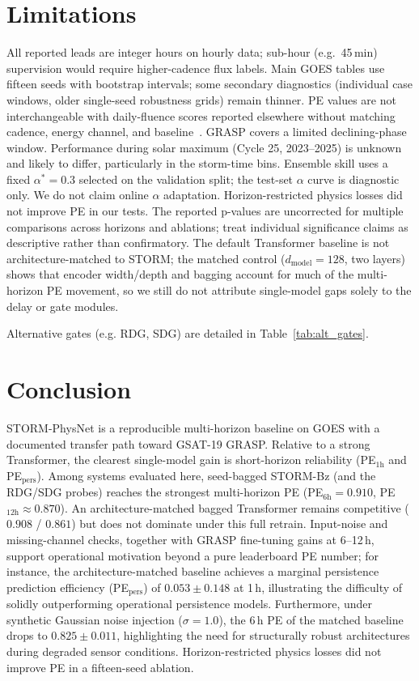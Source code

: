 \documentclass{ieeeaccess}
\begin{document}
\section{Limitations}
\label{sec:limits}
All reported leads are integer hours on hourly data; sub-hour (e.g.\ 45\,min) supervision would require higher-cadence flux labels.
Main GOES tables use fifteen seeds with bootstrap intervals; some
secondary diagnostics (individual case windows, older single-seed
robustness grids) remain thinner. PE values are not interchangeable with
daily-fluence scores reported elsewhere without matching cadence, energy
channel, and baseline~\cite{b21,b22}. GRASP covers a limited declining-phase
window. Performance during solar maximum (Cycle 25, 2023--2025) is unknown and likely to differ, particularly in the storm-time bins. Ensemble skill uses a fixed \(\alpha^*=0.3\) selected on the
validation split; the test-set \(\alpha\) curve is diagnostic only.
We do not claim online \(\alpha\) adaptation. Horizon-restricted
physics losses did not improve PE in our tests. The reported p-values are uncorrected for multiple comparisons across horizons and ablations; treat individual significance claims as descriptive rather than confirmatory.
The default Transformer baseline is not architecture-matched to STORM; the matched
control (\(d_{\mathrm{model}}=128\), two layers) shows that encoder width/depth and bagging
account for much of the multi-horizon PE movement, so we still do not attribute
single-model gaps solely to the delay or gate modules.

Alternative gates (e.g. RDG, SDG) are detailed in Table~\ref{tab:alt_gates}.

\section{Conclusion}
\label{sec:conclusion}
STORM-PhysNet is a reproducible multi-horizon baseline on GOES with a documented
transfer path toward GSAT-19 GRASP. Relative to a strong Transformer, the clearest single-model gain is short-horizon
reliability (PE$_{1\mathrm{h}}$ and PE$_{\mathrm{pers}}$).
Among systems evaluated here, seed-bagged STORM-Bz (and the RDG/SDG probes)
reaches the strongest multi-horizon PE
(PE$_{6\mathrm{h}}=0.910$, PE$_{12\mathrm{h}}\approx0.870$).
An architecture-matched bagged Transformer remains competitive
(\(0.908\) / \(0.861\)) but does not dominate under this full retrain.
Input-noise and missing-channel checks, together with GRASP fine-tuning
gains at 6--12\,h, support operational motivation beyond a pure leaderboard PE
number; for instance, the architecture-matched baseline achieves a marginal persistence prediction efficiency (PE\(_{\mathrm{pers}}\)) of \(0.053 \pm 0.148\) at 1\,h, illustrating the difficulty of solidly outperforming operational persistence models. Furthermore, under synthetic Gaussian noise injection (\(\sigma=1.0\)), the 6\,h PE of the matched baseline drops to \(0.825 \pm 0.011\), highlighting the need for structurally robust architectures during degraded sensor conditions. Horizon-restricted physics losses did not improve PE in a fifteen-seed
ablation.
\end{document}
